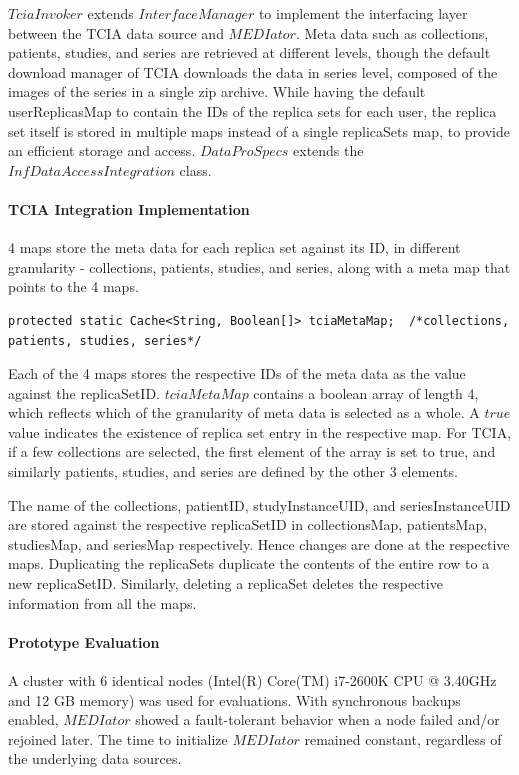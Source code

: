 \documentclass[conference]{IEEEtran}
\begin{document}
$TciaInvoker$ extends $InterfaceManager$ to implement the interfacing layer between the TCIA data source and $MEDIator$. Meta data such as collections, patients, studies, and series are retrieved at different levels, though the default download manager of TCIA downloads the data in series level, composed of the images of the series in a single zip archive. While having the default userReplicasMap to contain the IDs of the replica sets for each user, the replica set itself is stored in multiple maps instead of a single replicaSets map, to provide an efficient storage and access. $DataProSpecs$ extends the $InfDataAccessIntegration$ class. 

\paragraph*{\textbf{TCIA Integration Implementation}}
4 maps store the meta data for each replica set against its ID, in different granularity - collections, patients, studies, and series, along with a meta map that points to the 4 maps. 
\begin{lstlisting}  
protected static Cache<String, Boolean[]> tciaMetaMap;  /*collections, patients, studies, series*/
\end{lstlisting} 
Each of the 4 maps stores the respective IDs of the meta data as the value against the replicaSetID. $tciaMetaMap$ contains a boolean array of length 4, which reflects which of the granularity of meta data is selected as a whole. A $true$ value indicates the existence of replica set entry in the respective map. For TCIA, if a few collections are selected, the first element of the array is set to true, and similarly patients, studies, and series are defined by the other 3 elements.

The name of the collections, patientID, studyInstanceUID, and seriesInstanceUID are stored against the respective replicaSetID in collectionsMap, patientsMap, studiesMap, and seriesMap respectively. Hence changes are done at the respective maps. Duplicating the replicaSets duplicate the contents of the entire row to a new replicaSetID. Similarly, deleting a replicaSet deletes the respective information from all the maps.

\paragraph*{\textbf{Prototype Evaluation}}
A cluster with 6 identical nodes (Intel(R) Core(TM) i7-2600K CPU @ 3.40GHz and 12 GB memory) was used for evaluations. With synchronous backups enabled, $MEDIator$ showed a fault-tolerant behavior when a node failed and/or rejoined later. The time to initialize $MEDIator$ remained constant, regardless of the underlying data sources.
\end{document}
